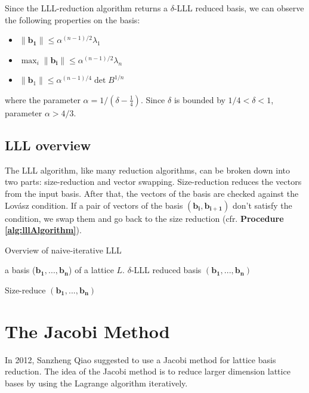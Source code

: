 \documentclass[10pt, a4paper]{article}
\renewcommand{\vec}[1]{\mathbf{#1}}
\begin{document}
Since the LLL-reduction algorithm returns a $\delta$-LLL reduced basis, we can observe the following properties on the basis:
\begin{itemize}
\item $\| \vec{b_1} \| \leq \alpha^{(n-1)/2} \lambda_1 $
\item $\max_i \| \vec{b_i} \| \leq \alpha^{(n-1)/2} \lambda_n $
\item $\| \vec{b}_1 \| \leq \alpha^{(n-1)/4} \det B^{1/n}$
\end{itemize} 
where the parameter $\alpha = 1/(\delta - \frac{1}{4})$. Since $\delta$ is bounded by $1/4 < \delta < 1$, parameter $\alpha > 4/3$.

\subsection{LLL overview}

The LLL algorithm, like many reduction algorithms, can be broken down into two parts: size-reduction and vector swapping. Size-reduction reduces the vectors from the input basis. After that, the vectors of the basis are checked against the Lovász condition. If a pair of vectors of the basis $(\vec{b_{i}}, \vec{b_{i+1}})$ don't satisfy the condition, we swap them and go back to the size reduction (cfr. \textbf{Procedure \ref{alg:lllAlgorithm}}).

\begin{algorithm}[H]
\caption{Overview of naive-iterative LLL}
\label{alg:lllAlgorithm}
\begin{algorithmic}[1]
\REQUIRE a basis ($\vec{b_1, ..., b_n}$) of a lattice $L$.
\ENSURE $\delta$-LLL reduced basis $(\vec{b_1, ..., b_n})$

\STATE Size-reduce $(\vec{b_1, ..., b_n})$
 \STATE{swap $\vec{b_j}$ and $\vec{b_{j+1}}$, go back to step 1} \ENDIF

\end{algorithmic}
\end{algorithm}

\section{The Jacobi Method}

In 2012, Sanzheng Qiao suggested to use a Jacobi method for lattice basis reduction\cite{originalJacobiMethodLatticeBasisReduction}. The idea of the Jacobi method is to reduce larger dimension lattice bases by using the Lagrange algorithm iteratively.
\end{document}
